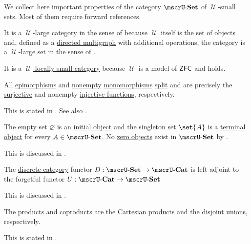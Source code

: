 \begin{proposition}\label{thm:def:category_of_small_sets}
  We collect here important properties of the category \hyperref[def:category_of_small_sets]{\( \ucat{Set} \)} of \( \mscrU \)-small sets. Most of them require forward references.

  \begin{thmenum}
     It is a \( \mscrU \)-large category in the sense of  because \( \mscrU \) itself is the set of objects and, defined as a \hyperref[def:directed_multigraph]{directed multigraph} with additional operations, the category is a \( \mscrU \)-large set in the sense of .

     It is a \hyperref[def:category_size]{\( \mscrU \)-locally small category} because \( \mscrU \) is a model of \hyperref[def:zfc]{\( \textsf{ZFC} \)} and  holds.

     All \hyperref[def:morphism_invertibility/right_cancellative]{epimorphisms} and \hyperref[def:set_valued_map/empty]{nonempty} \hyperref[def:morphism_invertibility/left_cancellative]{monomorphisms} \hyperref[def:morphism_invertibility/left_invertible]{split} and are precisely the \hyperref[def:function_invertibility/surjective]{surjective} and nonempty \hyperref[def:function_invertibility/injective]{injective functions}, respectively.

    This is stated in . See also .

     The empty set \( \varnothing \) is an \hyperref[def:universal_objects/initial]{initial object} and the singleton set \( \set{ A } \) is a \hyperref[def:universal_objects/terminal]{terminal object} for every \( A \in \ucat{Set} \). No \hyperref[def:universal_objects/zero]{zero objects} exist in \( \ucat{Set} \) by .

    This is discussed in .

     The \hyperref[def:discrete_category]{discrete category} functor \( D: \ucat{Set} \to \ucat{Cat} \) is left adjoint to the forgetful functor \( U: \ucat{Cat} \to \ucat{Set} \)

    This is discussed in .

     The \hyperref[def:discrete_category_limits]{products} and \hyperref[def:discrete_category_limits]{coproducts} are the \hyperref[def:cartesian_product/product]{Cartesian products} and the \hyperref[def:disjoint_union]{disjoint unions}, respectively.

    This is stated in .
  \end{thmenum}
\end{proposition}

